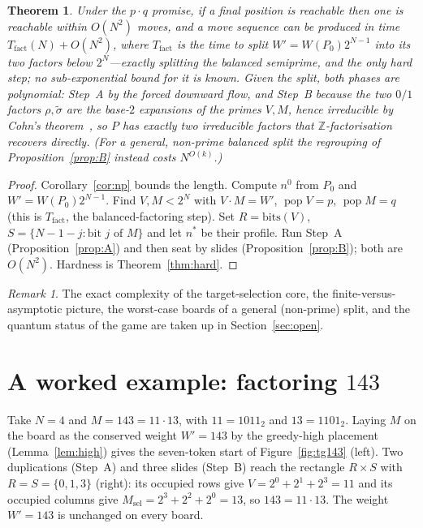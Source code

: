 \documentclass[11pt]{article}
\theoremstyle{definition}
\theoremstyle{plain}
\newtheorem{theorem}{Theorem}
\theoremstyle{remark}
\newtheorem{remark}{Remark}
\newcommand{\Z}{\mathbb{Z}}
\newcommand{\popc}{\operatorname{pop}}
\begin{document}
\begin{theorem}\label{thm:main}
Under the $p\cdot q$ promise, if a final position is reachable then one is
reachable within $O(N^2)$ moves, and a move sequence can be produced in time
$T_{\mathrm{fact}}(N)+O(N^2)$, where $T_{\mathrm{fact}}$ is the time to split
$W'=W(P_0)2^{N-1}$ into its two factors below $2^{N}$---exactly splitting the balanced
semiprime, and the only hard step; no sub-exponential bound for it is known. Given the
split, both phases are polynomial: Step~A by the forced downward flow, and Step~B because the
two $0/1$ factors $\rho,\tilde\sigma$ are the base-$2$ expansions of the primes $V,M$, hence
irreducible by Cohn's theorem~\cite{bfo}, so $P$ has exactly two irreducible factors that
$\Z$-factorisation recovers directly.  (For a general, non-prime balanced split the
regrouping of Proposition~\ref{prop:B} instead costs $N^{O(k)}$.)
\end{theorem}
\begin{proof}
Corollary~\ref{cor:np} bounds the length.  Compute $n^0$ from $P_0$ and
$W'=W(P_0)2^{N-1}$.  Find $V,M<2^{N}$ with $V\cdot M=W'$, $\popc V=p$, $\popc
M=q$ (this is $T_{\mathrm{fact}}$, the balanced-factoring step).  Set $R=\mathrm{bits}(V)$,
$S=\{N-1-j:\text{bit }j\text{ of }M\}$ and let $n^{*}$ be their profile.  Run
Step~A (Proposition~\ref{prop:A}) and then seat by slides
(Proposition~\ref{prop:B}); both are $O(N^2)$.  Hardness is
Theorem~\ref{thm:hard}.
\end{proof}

\begin{remark}
The exact complexity of the target-selection core, the finite-versus-asymptotic picture,
the worst-case boards of a general (non-prime) split, and the quantum status of the game are
taken up in Section~\ref{sec:open}.
\end{remark}

\section{A worked example: factoring \texorpdfstring{$143$}{143}}\label{sec:example}

Take $N=4$ and $M=143=11\cdot 13$, with $11=1011_2$ and $13=1101_2$. Laying $M$ on the
board as the conserved weight $W'=143$ by the greedy-high placement
(Lemma~\ref{lem:high}) gives the seven-token start of Figure~\ref{fig:tg143} (left).
Two duplications (Step~A) and three slides (Step~B) reach the rectangle $R\times S$ with
$R=S=\{0,1,3\}$ (right): its occupied rows give $V=2^0+2^1+2^3=11$ and its occupied
columns give $M_{\mathrm{sel}}=2^{3}+2^{2}+2^{0}=13$, so $143=11\cdot 13$. The weight
$W'=143$ is unchanged on every board.
\end{document}
